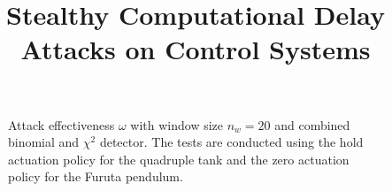 \documentclass{article}
\title{Stealthy Computational Delay Attacks on Control Systems}
\newcommand{\vecsize}[1]{n_{#1}}
\newcommand{\iteration}{w}
\newcommand{\aeffect}{\omega}
\begin{document}
\maketitle

\begin{figure*}
    \centering
    
    \vspace{-1cm}
    \caption{Attack effectiveness $\aeffect$ with window size $\vecsize{\iteration} = 20$ and combined binomial and $\chi^2$ detector. The tests are conducted using the hold actuation policy for the quadruple tank and the zero actuation policy for the Furuta pendulum.}
    \vspace{-.35cm}
    \label{fig:effect_maxa}
\end{figure*}
\end{document}
